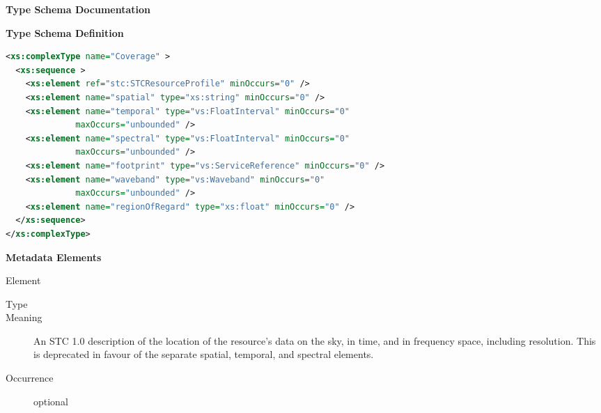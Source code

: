 \documentclass[11pt,a4paper]{ivoa}
\begin{document}
\begin{generated}
\begingroup
      	\renewcommand*\descriptionlabel[1]{%
      	\hbox to 5.5em{\emph{#1}\hfil}}\vspace{2ex}\noindent\textbf{ Type Schema Documentation}


\vspace{1ex}\noindent\textbf{ Type Schema Definition}

\begin{lstlisting}[language=XML,basicstyle=\footnotesize]
<xs:complexType name="Coverage" >
  <xs:sequence >
    <xs:element ref="stc:STCResourceProfile" minOccurs="0" />
    <xs:element name="spatial" type="xs:string" minOccurs="0" />
    <xs:element name="temporal" type="vs:FloatInterval" minOccurs="0"
              maxOccurs="unbounded" />
    <xs:element name="spectral" type="vs:FloatInterval" minOccurs="0"
              maxOccurs="unbounded" />
    <xs:element name="footprint" type="vs:ServiceReference" minOccurs="0" />
    <xs:element name="waveband" type="vs:Waveband" minOccurs="0"
              maxOccurs="unbounded" />
    <xs:element name="regionOfRegard" type="xs:float" minOccurs="0" />
  </xs:sequence>
</xs:complexType>
\end{lstlisting}

\vspace{0.5ex}\noindent\textbf{ Metadata Elements}

\begingroup\small\begin{bigdescription}\item[Element \xmlel{}]
\begin{description}
\item[Type] 
\item[Meaning] 
                 An STC 1.0 description of the location of the resource's 
                 data on the sky, in time, and in frequency space, 
                 including resolution.   This is deprecated in favour
                 of the separate spatial, temporal, and spectral elements.
               
\item[Occurrence] optional


\end{description}
\end{bigdescription}
\end{generated}
\end{document}
